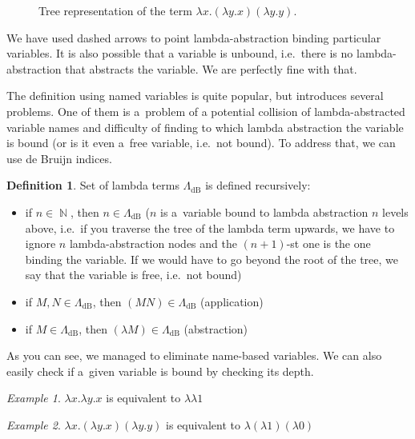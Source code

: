 \documentclass[final]{article}
\theoremstyle{definition}
\newtheorem{definition}{Definition}[subsection]
\theoremstyle{definition}
\theoremstyle{remark}
\newtheorem{example}{Example}[subsection]
\newcommand{\LambdadB}{\ensuremath{\Lambda_{\text{dB}}}}
\DeclareMathOperator{\N}{\mathbb{N}}
\begin{document}
\begin{figure}[H]
    \centering
    
    \caption{Tree representation of the term \(\lambda x. (\lambda y.x) (\lambda y.y)\).}%
    \label{fig:lambda_tree_example}
\end{figure}

We have used dashed arrows to point lambda-abstraction binding particular variables. It is also possible that a variable is unbound, i.e.~there is no lambda-abstraction that abstracts the variable. We are perfectly fine with that.

The definition using named variables is quite popular, but introduces several problems. One of them is a~problem of a potential collision of lambda-abstracted variable names and difficulty of finding to which lambda abstraction the variable is bound (or is it even a~free variable, i.e.~not bound). To address that, we can use de Bruijn indices.

\begin{definition}
    Set of lambda terms \(\LambdadB\) is defined recursively:
    \begin{itemize}
        \item if \(n \in \N\), then \(n \in \LambdadB\) (\(n\) is a~variable bound to lambda abstraction \(n\) levels above, i.e.~if you traverse the tree of the lambda term upwards, we have to ignore \(n\) lambda-abstraction nodes and the \((n+1)\)-st one is the one binding the variable. If we would have to go beyond the root of the tree, we say that the variable is free, i.e.~not bound)
        \item if \(M, N \in \LambdadB\), then \((M N) \in \LambdadB\) (application)
        \item if \(M \in \LambdadB\), then \((\lambda M) \in \LambdadB\) (abstraction)
    \end{itemize}
\end{definition}

As you can see, we managed to eliminate name-based variables. We can also easily check if a~given variable is bound by checking its depth.

\begin{example}
    \(\lambda x.\lambda y.x\) is equivalent to \(\lambda \lambda 1\)
\end{example}

\begin{example}
    \(\lambda x. (\lambda y.x) (\lambda y.y)\) is equivalent to \(\lambda (\lambda 1) (\lambda 0)\)
\end{example}
\end{document}
